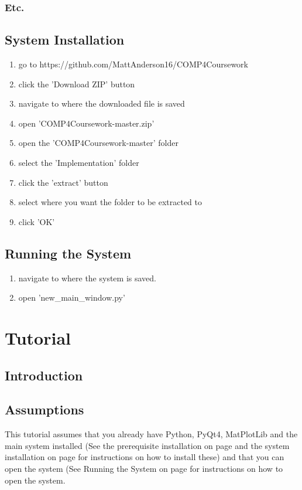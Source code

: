 \subsubsection{Etc.}

\subsection{System Installation}
\label{System_Installation}
\begin{enumerate}
	\item go to https://github.com/MattAnderson16/COMP4Coursework
	\item click the 'Download ZIP' button
	\item navigate to where the downloaded file is saved
	\item open 'COMP4Coursework-master.zip'
	\item open the 'COMP4Coursework-master' folder 
	\item select the 'Implementation' folder
	\item click the 'extract' button
	\item select where you want the folder to be extracted to
	\item click 'OK'
\end{enumerate}

\subsection{Running the System}
\label{Running_the_System}
\begin{enumerate}
	\item navigate to where the system is saved.
	\item open 'new\_main\_window.py'
\end{enumerate}

\section{Tutorial}

\subsection{Introduction}

\subsection{Assumptions}
This tutorial assumes that you already have Python, PyQt4, MatPlotLib and the main system installed (See the prerequisite installation on page \pageref{Prerequisite_Installation} and the system installation on page \pageref{System_Installation} for instructions on how to install these) and that you can open the system (See Running the System on page \pageref{Running_the_System} for instructions on how to open the system.

